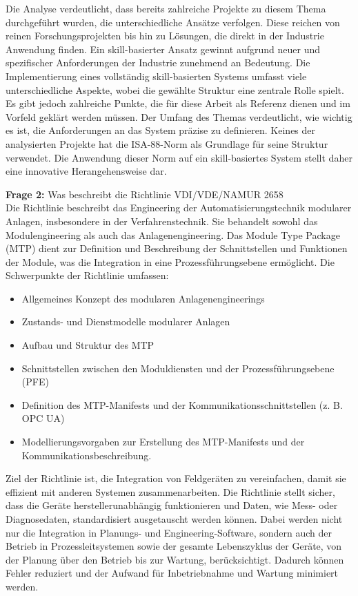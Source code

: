 	\newpage
	
	Die Analyse verdeutlicht, dass bereits zahlreiche Projekte zu diesem Thema durchgeführt wurden, die unterschiedliche Ansätze verfolgen. Diese reichen von reinen Forschungsprojekten bis hin zu Lösungen, die direkt in der Industrie Anwendung finden. Ein skill-basierter Ansatz gewinnt aufgrund neuer und spezifischer Anforderungen der Industrie zunehmend an Bedeutung.
	Die Implementierung eines vollständig skill-basierten Systems umfasst viele unterschiedliche Aspekte, wobei die gewählte Struktur eine zentrale Rolle spielt. Es gibt jedoch zahlreiche Punkte, die für diese Arbeit als Referenz dienen und im Vorfeld geklärt werden müssen. Der Umfang des Themas verdeutlicht, wie wichtig es ist, die Anforderungen an das System präzise zu definieren.
	Keines der analysierten Projekte hat die ISA-88-Norm als Grundlage für seine Struktur verwendet. Die Anwendung dieser Norm auf ein skill-basiertes System stellt daher eine innovative Herangehensweise dar.
	\vspace{3mm}
	
	\textbf{Frage 2:} Was beschreibt die Richtlinie VDI/VDE/NAMUR 2658 \vspace{2mm} 
	\\
	Die Richtlinie beschreibt das Engineering der Automatisierungstechnik modularer Anlagen, insbesondere in der Verfahrenstechnik. Sie behandelt sowohl das Modulengineering als auch das Anlagenengineering. Das Module Type Package (MTP) dient zur Definition und Beschreibung der Schnittstellen und Funktionen der Module, was die Integration in eine Prozessführungsebene ermöglicht. Die Schwerpunkte der Richtlinie umfassen:
	\begin{itemize}
		\item Allgemeines Konzept des modularen Anlagenengineerings
		\item Zustands- und Dienstmodelle modularer Anlagen
		\item Aufbau und Struktur des MTP
		\item Schnittstellen zwischen den Moduldiensten und der Prozessführungsebene (PFE)
		\item Definition des MTP-Manifests und der Kommunikationsschnittstellen (z. B. OPC UA)
		\item Modellierungsvorgaben zur Erstellung des MTP-Manifests und der Kommunikationsbeschreibung.
	\end{itemize}
	Ziel der Richtlinie ist, die Integration von Feldgeräten zu vereinfachen, damit sie effizient mit anderen Systemen zusammenarbeiten. Die Richtlinie stellt sicher, dass die Geräte herstellerunabhängig funktionieren und Daten, wie Mess- oder Diagnosedaten, standardisiert ausgetauscht werden können. Dabei werden nicht nur die Integration in Planungs- und Engineering-Software, sondern auch der Betrieb in Prozessleitsystemen sowie der gesamte Lebenszyklus der Geräte, von der Planung über den Betrieb bis zur Wartung, berücksichtigt. Dadurch können Fehler reduziert und der Aufwand für Inbetriebnahme und Wartung minimiert werden.
	\vspace{3mm}
	
